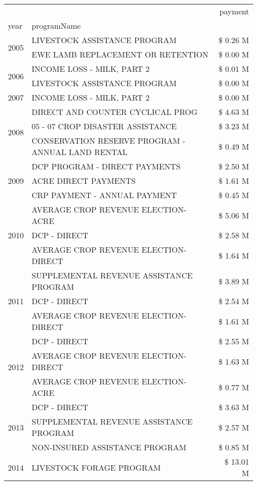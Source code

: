 \begin{tabular}{llr}
\toprule
 &  & payment \\
year & programName &  \\
\midrule
\multirow[t]{2}{*}{2005} & LIVESTOCK ASSISTANCE PROGRAM & \$ 0.26 M \\
 & EWE LAMB REPLACEMENT OR RETENTION & \$ 0.00 M \\
\cline{1-3}
\multirow[t]{2}{*}{2006} & INCOME LOSS - MILK, PART 2 & \$ 0.01 M \\
 & LIVESTOCK ASSISTANCE PROGRAM & \$ 0.00 M \\
\cline{1-3}
2007 & INCOME LOSS - MILK, PART 2 & \$ 0.00 M \\
\cline{1-3}
\multirow[t]{3}{*}{2008} & DIRECT AND COUNTER CYCLICAL PROG & \$ 4.63 M \\
 & 05 - 07 CROP DISASTER ASSISTANCE & \$ 3.23 M \\
 & CONSERVATION RESERVE PROGRAM - ANNUAL LAND RENTAL & \$ 0.49 M \\
\cline{1-3}
\multirow[t]{3}{*}{2009} & DCP PROGRAM - DIRECT PAYMENTS & \$ 2.50 M \\
 & ACRE DIRECT PAYMENTS & \$ 1.61 M \\
 & CRP PAYMENT - ANNUAL PAYMENT & \$ 0.45 M \\
\cline{1-3}
\multirow[t]{3}{*}{2010} & AVERAGE CROP REVENUE ELECTION-ACRE & \$ 5.06 M \\
 & DCP - DIRECT & \$ 2.58 M \\
 & AVERAGE CROP REVENUE ELECTION-DIRECT & \$ 1.64 M \\
\cline{1-3}
\multirow[t]{3}{*}{2011} & SUPPLEMENTAL REVENUE ASSISTANCE PROGRAM & \$ 3.89 M \\
 & DCP - DIRECT & \$ 2.54 M \\
 & AVERAGE CROP REVENUE ELECTION-DIRECT & \$ 1.61 M \\
\cline{1-3}
\multirow[t]{3}{*}{2012} & DCP - DIRECT & \$ 2.55 M \\
 & AVERAGE CROP REVENUE ELECTION-DIRECT & \$ 1.63 M \\
 & AVERAGE CROP REVENUE ELECTION-ACRE & \$ 0.77 M \\
\cline{1-3}
\multirow[t]{3}{*}{2013} & DCP - DIRECT & \$ 3.63 M \\
 & SUPPLEMENTAL REVENUE ASSISTANCE PROGRAM & \$ 2.57 M \\
 & NON-INSURED ASSISTANCE PROGRAM & \$ 0.85 M \\
\cline{1-3}
\multirow[t]{3}{*}{2014} & LIVESTOCK FORAGE PROGRAM & \$ 13.01 M \\

\end{tabular}
